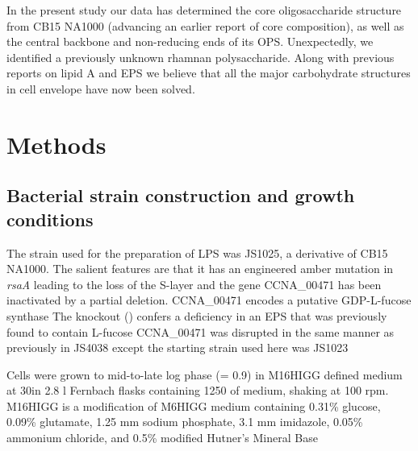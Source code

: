 In the present study our data has determined the core oligosaccharide structure from
\caulobacter CB15 NA1000 (advancing an earlier report of core
composition), as well as the central backbone and
non-reducing ends of its \ac{OPS}. Unexpectedly, we identified a previously
unknown rhamnan polysaccharide. Along with previous reports on lipid
A and \ac{EPS} we believe
that all the major carbohydrate structures in \caulobacter cell envelope have
now been solved.
 

\section{Methods} %
\label{sec:lps_methods}

	\subsection{Bacterial strain construction and growth conditions} %
	\label{sub:bacterial_strain_construction_and_growth_conditions}

  The strain used for the preparation of \ac{LPS} was JS1025, a derivative of \caulobacter CB15
  NA1000. The salient features are that it has an engineered amber mutation in \textit{rsaA} leading
  to the loss of the \ac{S-layer} and the gene CCNA\_00471 has been inactivated by a partial
  deletion. CCNA\_00471 encodes a putative GDP-L-fucose synthase The
  knockout () confers a deficiency in an \ac{EPS} that was previously found to contain
  L-fucose CCNA\_00471 was disrupted in the same manner as previously in
  JS4038 except the starting strain used here was
  JS1023
		
  Cells were grown to mid-to-late log phase (\od = 0.9) in M16HIGG defined medium at 30\cel in 2.8
  \si{\litre} Fernbach flasks containing 1250 \millilitre of medium, shaking at 100 rpm. M16HIGG is
  a modification of M6HIGG medium containing 0.31\% glucose, 0.09\%
  glutamate, 1.25 \si{\milli\meter} sodium phosphate, 3.1 \si{\milli\meter} imidazole, 0.05\%
  ammonium chloride, and 0.5\% modified Hutner's Mineral Base

